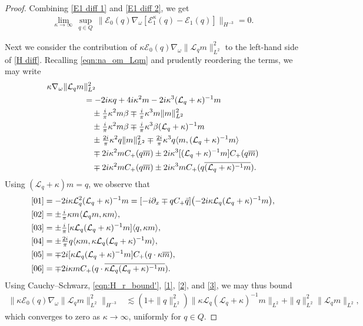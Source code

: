 \documentclass{amsart}
\numberwithin{equation}{section}
\theoremstyle{definition}
\newcommand{\om}{\omega}
\newcommand{\ka}{\kappa}
\newcommand{\E}{\mathcal{E}}
\newcommand{\Lc}{\mathcal{L}}
\newcommand{\na}{\nabla}
\newcommand{\lan}{\langle}
\newcommand{\ran}{\rangle}
\begin{document}
\begin{proof}
Combining \eqref{E1 diff 1} and \eqref{E1 diff 2}, we get
\begin{align*}
\lim_{\ka\to\infty}\,\sup_{q\in Q}\,\bigl\|\E_0(q)\na_\om[\E_1^\ka(q)-\E_1(q)]\bigr\|_{H^{-3}} =0.
\end{align*}

Next we consider the contribution of $\ka \E_0(q) \na_\om \|\Lc_q m\|_{L^2}^2$ to the left-hand side of \eqref{H diff}. Recalling \eqref{eqn:na_om_Lqm} and prudently reordering the terms, we may write 
\begin{align}
\ka \na_\om\| \Lc_qm&\|_{L^2}^2\notag\\
&=-2i\ka q+4i\ka^2 m-2i\ka^3(\Lc_q+\ka)^{-1}m\label{01}\\
&\quad\pm\tfrac{i}{\pi}\ka^2 m\beta\mp \tfrac{i}{\pi}\ka^3m\| m\|_{L^2}^2\label{02}\\
&\quad\pm\tfrac{i}{\pi}\ka^2 m\beta\mp \tfrac{i}{\pi}\ka^3\beta(\Lc_q+\ka)^{-1}m\label{03}\\
&\quad\pm\tfrac{2i}{\pi}\ka^2 q\|m\|^2_{L^2}\mp \tfrac{2i}{\pi}\ka^3 q\lan m,(\Lc_q+\ka)^{-1}m\ran\label{04}\\
&\quad\mp2i\ka^2m C_+(q\overline{m})\pm 2i\ka^3[(\Lc_q+\ka)^{-1}m] C_+(q\overline{m})\label{05}\\
&\quad\mp 2i\ka^2 m C_+(q\overline{m})\pm 2i\ka^3 mC_+(q\overline{(\Lc_q+\ka)^{-1}m}).\label{06}
\end{align}
Using $(\Lc_q+\ka)m=q$, we observe that
\begin{align*}
\eqref{01}&=-2i\ka \Lc_q^2 (\Lc_q+\ka)^{-1}m=[-i\partial_x \mp q C_+ \bar q]\bigl (-2i\ka \Lc_q (\Lc_q+\ka)^{-1}m \bigr),\\
\eqref{02}&= \pm\tfrac{i}{\pi}\ka m\lan \Lc_q m,\ka m\ran, \\
\eqref{03}&=\pm\tfrac{i}{\pi} [\ka\Lc_q(\Lc_q+\ka)^{-1}m] \langle q,\ka m\rangle,\\
\eqref{04}&=\pm\tfrac{2i}{\pi}q\lan \ka m,\ka \Lc_q(\Lc_q+\ka)^{-1}m\ran,\\
\eqref{05}&=\mp 2i[\ka\Lc_q(\Lc_q+\ka)^{-1}m]C_+(q\cdot \ka\overline{m}),\\
\eqref{06}&=\mp 2i\ka m C_+(q\cdot \overline{\ka\Lc_q(\Lc_q+\ka)^{-1}m}).
\end{align*}
Using Cauchy--Schwarz,  \eqref{eqn:H_r_bound'}, \eqref{1}, \eqref{2}, and \eqref{3}, we may thus bound
\begin{align*}
\bigl\|\ka \E_0(q) \na_\om \|\Lc_q m\|_{L^2}^2 \bigr\|_{H^{-3}}&\lesssim (1+\|q\|_{L^2}^2)\|\ka \Lc_q (\Lc_q+\ka)^{-1}m\|_{L^2}+ \|q\|_{L^2}^2\|\Lc_q m\|_{L^2}, 
\end{align*}
which converges to zero as $\ka\to\infty$, uniformly for $q\in Q$.


\end{proof}
\end{document}
